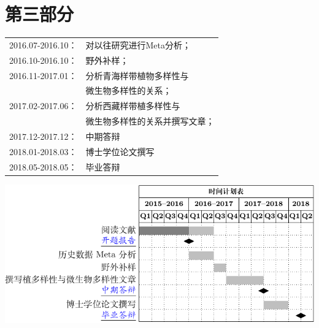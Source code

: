 \section{第三部分}
\begin{frame}{\insertsection}{\insertsubsection}
\begin{center}
	\begin{tabular}{ l l  }
		2016.07-2016.10： & 对以往研究进行Meta分析；\\ 
		2016.10-2016.10： & 野外补样；\\
		2016.11-2017.01： & 分析青海样带植物多样性与\\
		& 微生物多样性的关系；\\
		2017.02-2017.06： & 分析西藏样带植多样性与\\
		& 微生物多样性的关系并撰写文章；\\  
		2017.12-2017.12： & 中期答辩\\
		2018.01-2018.03： & 博士学位论文撰写\\
		2018.05-2018.05： & 毕业答辩
	\end{tabular}
\end{center}

\end{frame}
\begin{frame}{\insertsection}{\insertsubsection}
	\begin{center}
		\includegraphics[width = \textwidth]{./pic/gatt.pdf}
	\end{center}
\end{frame}



